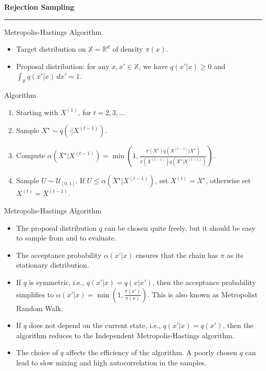 \documentclass[aspectratio=169]{beamer}
\begin{document}
\begin{frame}
	\vspace{2cm}
	\begin{center}
		{\Huge\textbf{\textcolor{copenhagenred}{Rejection Sampling}}}
		\vspace{1cm}

		\rule{4cm}{3pt}
		\vspace{2cm}
	\end{center}
\end{frame}


\begin{frame}{Metropolis-Hastings Algorithm}
	\begin{itemize}
		\item Target distribution on $\mathbb{X} = \mathbb{R}^d$ of density $\pi(x)$.
		\item Proposal distribution: for any $x, x' \in \mathbb{X}$, we have $q(x'|x) \geq 0$ and $\int_{\mathbb{X}} q(x'|x) \, dx' = 1$.


	\end{itemize}
	\begin{block}{Algorithm}
		\begin{enumerate}
			\item Starting with $X^{(1)}$, for $t = 2, 3, \ldots$
			\item Sample $X^{\star} \sim q(\cdot | X^{(t-1)})$.
			\item Compute $\alpha(X^{\star} | X^{(t-1)}) = \min\left(1, \frac{\pi(X^{\star}) q(X^{(t-1)} | X^{\star})}{\pi(X^{(t-1)}) q(X^{\star} | X^{(t-1)})}\right).$
			\item Sample $U \sim \mathcal{U}_{[0,1]}$. If $U \leq \alpha(X^{\star} | X^{(t-1)})$, set $X^{(t)} = X^{\star}$, otherwise set $X^{(t)} = X^{(t-1)}$.
		\end{enumerate}
	\end{block}
\end{frame}

\begin{frame}{Metropolis-Hastings Algorithm}
	\begin{itemize}
		\item The proposal distribution $q$ can be chosen quite freely, but it should be easy to sample from and to evaluate.
		\item The acceptance probability $\alpha(x'|x)$ ensures that the chain has $\pi$ as its stationary distribution.
		\item If $q$ is symmetric, i.e., $q(x'|x) = q(x|x')$, then the acceptance probability simplifies to $\alpha(x'|x) = \min\left(1, \frac{\pi(x')}{\pi(x)}\right)$. This is also known as Metropolist Random Walk.
		\item If $q$ does not depend on the current state, i.e., $q(x'|x) = q(x')$, then the algorithm reduces to the Independent Metropolis-Hastings algorithm.
		\item The choice of $q$ affects the efficiency of the algorithm. A poorly chosen $q$ can lead to slow mixing and high autocorrelation in the samples.
	\end{itemize}
\end{frame}
\end{document}
